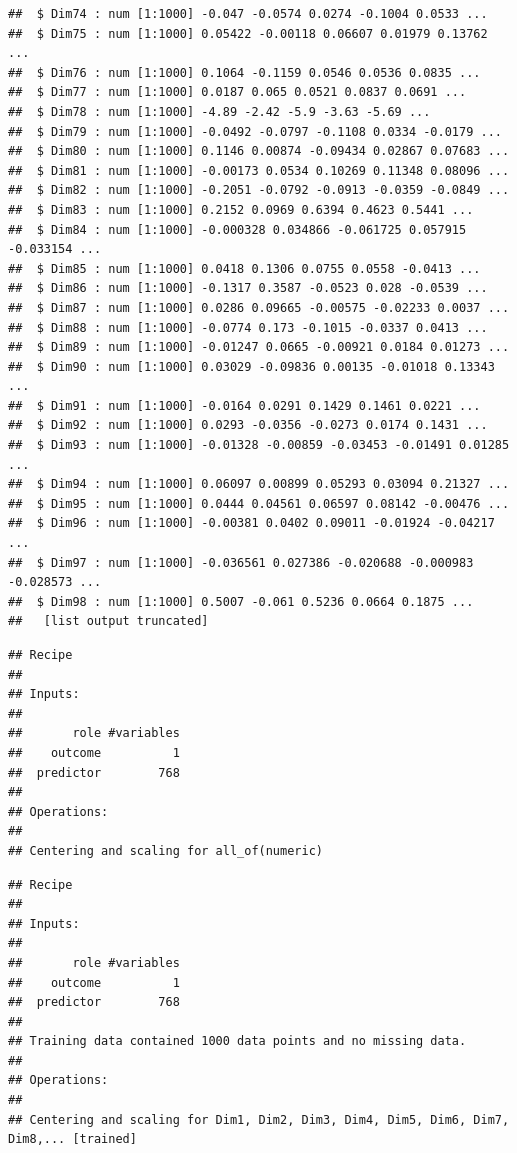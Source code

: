 \documentclass[
  english,
  man]{apa6}
\begin{document}
\begin{verbatim}
##  $ Dim74 : num [1:1000] -0.047 -0.0574 0.0274 -0.1004 0.0533 ...
##  $ Dim75 : num [1:1000] 0.05422 -0.00118 0.06607 0.01979 0.13762 ...
##  $ Dim76 : num [1:1000] 0.1064 -0.1159 0.0546 0.0536 0.0835 ...
##  $ Dim77 : num [1:1000] 0.0187 0.065 0.0521 0.0837 0.0691 ...
##  $ Dim78 : num [1:1000] -4.89 -2.42 -5.9 -3.63 -5.69 ...
##  $ Dim79 : num [1:1000] -0.0492 -0.0797 -0.1108 0.0334 -0.0179 ...
##  $ Dim80 : num [1:1000] 0.1146 0.00874 -0.09434 0.02867 0.07683 ...
##  $ Dim81 : num [1:1000] -0.00173 0.0534 0.10269 0.11348 0.08096 ...
##  $ Dim82 : num [1:1000] -0.2051 -0.0792 -0.0913 -0.0359 -0.0849 ...
##  $ Dim83 : num [1:1000] 0.2152 0.0969 0.6394 0.4623 0.5441 ...
##  $ Dim84 : num [1:1000] -0.000328 0.034866 -0.061725 0.057915 -0.033154 ...
##  $ Dim85 : num [1:1000] 0.0418 0.1306 0.0755 0.0558 -0.0413 ...
##  $ Dim86 : num [1:1000] -0.1317 0.3587 -0.0523 0.028 -0.0539 ...
##  $ Dim87 : num [1:1000] 0.0286 0.09665 -0.00575 -0.02233 0.0037 ...
##  $ Dim88 : num [1:1000] -0.0774 0.173 -0.1015 -0.0337 0.0413 ...
##  $ Dim89 : num [1:1000] -0.01247 0.0665 -0.00921 0.0184 0.01273 ...
##  $ Dim90 : num [1:1000] 0.03029 -0.09836 0.00135 -0.01018 0.13343 ...
##  $ Dim91 : num [1:1000] -0.0164 0.0291 0.1429 0.1461 0.0221 ...
##  $ Dim92 : num [1:1000] 0.0293 -0.0356 -0.0273 0.0174 0.1431 ...
##  $ Dim93 : num [1:1000] -0.01328 -0.00859 -0.03453 -0.01491 0.01285 ...
##  $ Dim94 : num [1:1000] 0.06097 0.00899 0.05293 0.03094 0.21327 ...
##  $ Dim95 : num [1:1000] 0.0444 0.04561 0.06597 0.08142 -0.00476 ...
##  $ Dim96 : num [1:1000] -0.00381 0.0402 0.09011 -0.01924 -0.04217 ...
##  $ Dim97 : num [1:1000] -0.036561 0.027386 -0.020688 -0.000983 -0.028573 ...
##  $ Dim98 : num [1:1000] 0.5007 -0.061 0.5236 0.0664 0.1875 ...
##   [list output truncated]
\end{verbatim}

\begin{verbatim}
## Recipe
## 
## Inputs:
## 
##       role #variables
##    outcome          1
##  predictor        768
## 
## Operations:
## 
## Centering and scaling for all_of(numeric)
\end{verbatim}

\begin{verbatim}
## Recipe
## 
## Inputs:
## 
##       role #variables
##    outcome          1
##  predictor        768
## 
## Training data contained 1000 data points and no missing data.
## 
## Operations:
## 
## Centering and scaling for Dim1, Dim2, Dim3, Dim4, Dim5, Dim6, Dim7, Dim8,... [trained]
\end{verbatim}
\end{document}
